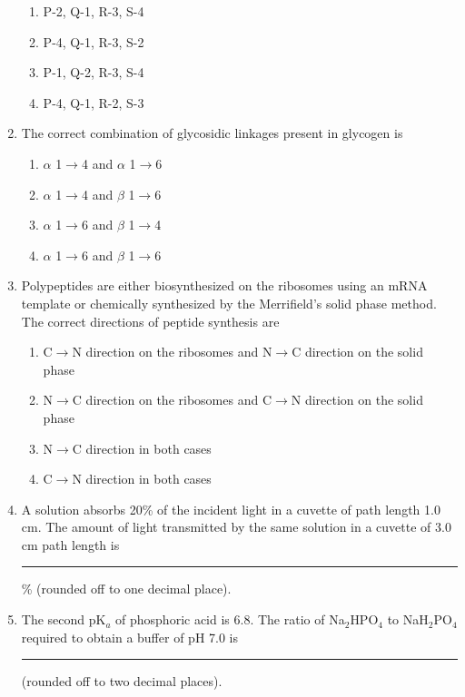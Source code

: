 \documentclass[journal,12pt,onecolumn]{IEEEtran}
\begin{document}
\begin{enumerate}[label=\arabic*.]
\begin{multicols}{2}
\begin{enumerate}[label=(\Alph*)]
    \item P-2, Q-1, R-3, S-4
    \item P-4, Q-1, R-3, S-2
    \item P-1, Q-2, R-3, S-4
    \item P-4, Q-1, R-2, S-3
\end{enumerate}
\end{multicols}

\item The correct combination of glycosidic linkages present in glycogen is
\begin{multicols}{2}
\begin{enumerate}[label=(\Alph*)]
    \item $\alpha$ 1$\rightarrow$4 and $\alpha$ 1$\rightarrow$6
\item $\alpha$ 1$\rightarrow$4 and $\beta$ 1$\rightarrow$6
    \item $\alpha$ 1$\rightarrow$6 and $\beta$ 1$\rightarrow$4
    \item $\alpha$ 1$\rightarrow$6 and $\beta$ 1$\rightarrow$6
\end{enumerate}
\end{multicols}

\item Polypeptides are either biosynthesized on the ribosomes using an mRNA template or chemically synthesized by the Merrifield’s solid phase method. The correct directions of peptide synthesis are
\begin{enumerate}[label=(\Alph*)]
    \item C$\rightarrow$N direction on the ribosomes and N$\rightarrow$C direction on the solid phase
    \item N$\rightarrow$C direction on the ribosomes and C$\rightarrow$N direction on the solid phase
    \item N$\rightarrow$C direction in both cases
    \item C$\rightarrow$N direction in both cases
\end{enumerate}

\item A solution absorbs 20\% of the incident light in a cuvette of path length 1.0 cm. The amount of light transmitted by the same solution in a cuvette of 3.0 cm path length is \rule{3cm}{0.1pt}\% (rounded off to one decimal place).

\item The second pK$_a$ of phosphoric acid is 6.8. The ratio of Na$_2$HPO$_4$ to NaH$_2$PO$_4$ required to obtain a buffer of pH 7.0 is \rule{3cm}{0.1pt} (rounded off to two decimal places).


\end{enumerate}
\end{document}
